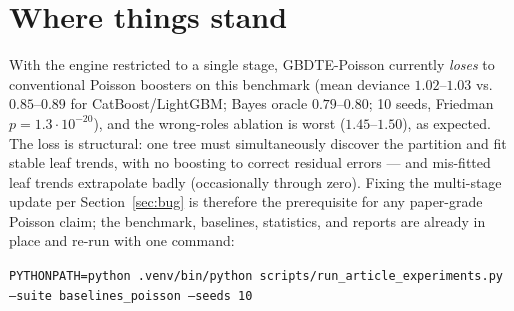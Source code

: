 \documentclass[11pt]{article}
\newcommand{\code}[1]{\texttt{\small #1}}
\begin{document}
\section{Where things stand}

With the engine restricted to a single stage, GBDTE-Poisson currently \emph{loses} to
conventional Poisson boosters on this benchmark (mean deviance $1.02$--$1.03$ vs.\
$0.85$--$0.89$ for CatBoost/LightGBM; Bayes oracle $0.79$--$0.80$; 10 seeds, Friedman
$p = 1.3\cdot 10^{-20}$), and the wrong-roles ablation is worst ($1.45$--$1.50$), as
expected. The loss is structural: one tree must simultaneously discover the partition
and fit stable leaf trends, with no boosting to correct residual errors --- and
mis-fitted leaf trends extrapolate badly (occasionally through zero). Fixing the
multi-stage update per Section~\ref{sec:bug} is therefore the prerequisite for any
paper-grade Poisson claim; the benchmark, baselines, statistics, and reports are already
in place and re-run with one command:
\begin{center}
\code{PYTHONPATH=python .venv/bin/python scripts/run\_article\_experiments.py
--suite baselines\_poisson --seeds 10}
\end{center}
\end{document}

